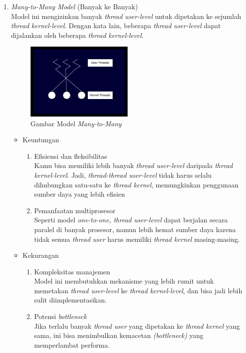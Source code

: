\documentclass[12pt]{article}
\begin{document}
\begin{enumerate}
    \item \textit{Many-to-Many Model} (Banyak ke Banyak)\\
    Model ini mengizinkan banyak \textit{thread user-level} 
    untuk dipetakan ke sejumlah \textit{thread kernel-level}. Dengan kata lain, 
    beberapa \textit{thread user-level} dapat dijalankan oleh beberapa 
    \textit{thread kernel-level}.
    \begin{figure}[h]
        \centering
        \includegraphics[width=0.5\textwidth]{asset/gambar-model-multithreading-many-to-many.jpg}
        \caption{Gambar Model \textit{Many-to-Many}}
    \end{figure}
    \begin{itemize}
        \item Keuntungan \\
            \begin{enumerate}
                \item Efisiensi dan fleksibilitas \\
                Kamu bisa memiliki lebih banyak \textit{thread user-level} daripada \textit{thread kernel-level}. Jadi, 
                \textit{thread-thread user-level} tidak harus selalu dihubungkan satu-satu ke \textit{thread kernel}, memungkinkan penggunaan sumber daya yang 
                lebih efisien
                \item Pemanfaatan multiprosesor \\
                Seperti model \textit{one-to-one, thread user-level} dapat berjalan secara paralel di banyak prosesor, 
                namun lebih hemat sumber daya karena tidak semua \textit{thread user} harus memiliki \textit{thread kernel} masing-masing.
            \end{enumerate}
        \item Kekurangan \\
            \begin{enumerate}
                \item Kompleksitas manajemen \\
                Model ini membutuhkan mekanisme yang lebih rumit untuk memetakan \textit{thread user-level} ke \textit{thread kernel-level}, dan bisa 
                jadi lebih sulit diimplementasikan.
                \item Potensi \textit{bottleneck} \\
                Jika terlalu banyak \textit{thread user} yang dipetakan ke \textit{thread kernel} yang sama, ini bisa menimbulkan kemacetan \textit{(bottleneck)} yang memperlambat performa.
            \end{enumerate}
    \end{itemize}


\end{enumerate}
\end{document}
